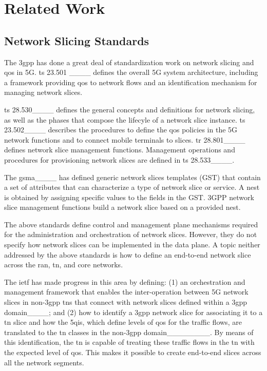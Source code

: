 \section{Related Work}
\label{sec:soa}
\subsection{Network Slicing Standards}
\label{subsec:soa-standards}
The \gls{3gpp} has done a great deal of standardization work on network slicing and \gls{qos} in 5G. \gls{ts} 23.501 ____ defines the overall 5G system architecture, including a framework providing \gls{qos} to network flows and an identification mechanism for managing network slices. 

\gls{ts} 28.530____ defines the general concepts and definitions for network slicing, as well as the phases that compose the lifecyle of a network slice instance. \gls{ts} 23.502____ describes the procedures to define the \gls{qos} policies in the 5G network functions and to connect mobile terminals to slices. \gls{tr} 28.801____ defines network slice management functions. Management operations and procedures for provisioning network slices are defined in \gls{ts} 28.533____.

The \protect\gls{gsma}____ has defined generic network slices templates (GST) that contain a set of attributes that can characterize a type of network slice or service. A \gls{nest} is obtained by assigning specific values to the fields in the GST. 3GPP network slice management functions build a network slice based on a provided \gls{nest}.

The above standards define control and management plane mechanisms required for the administration and orchestration of network slices. However, they do not specify how network slices can be implemented in the data plane. A topic neither addressed by the above standards is how to define an end-to-end network slice across the \gls{ran}, \gls{tn}, and core networks. 

The \gls{ietf} has made progress in this area by defining: (1) an orchestration and management framework that enables the inter-operation between 5G network slices in non-\gls{3gpp} \glspl{tn} that connect with network slices defined within a \gls{3gpp} domain____; and (2) how to identify a \gls{3gpp} network slice for associating it to a \gls{tn} slice and how the \glspl{5qi}, which define levels of \gls{qos} for the traffic flows, are translated to the \gls{tn} classes in the non-\gls{3gpp} domain________. By means of this identification, the \gls{tn} is capable of treating these traffic flows in the \gls{tn} with the expected level of \gls{qos}. This makes it possible to create end-to-end slices across all the network segments. 


